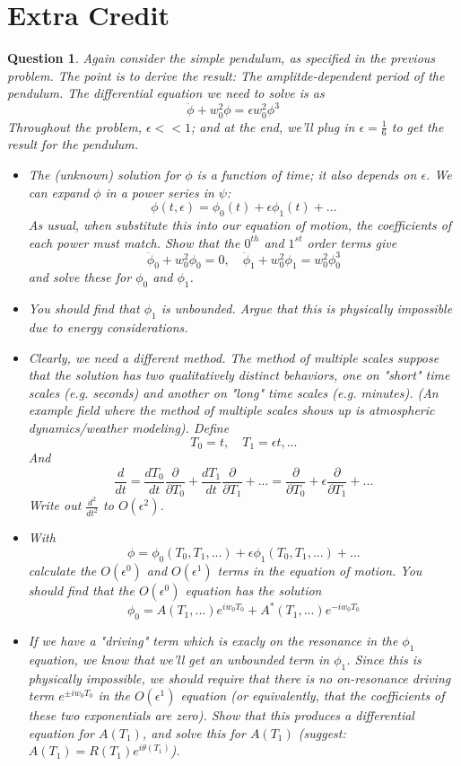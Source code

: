 \documentclass{article}
\newtheorem{question}{Question}
\begin{document}
\break

\section{Extra Credit}
\begin{question}\label{q7}
    Again consider the simple pendulum, as specified in the previous problem. The point is to derive the result: The amplitde-dependent period of the pendulum. The differential equation we need to solve is as 
    $$\ddot\phi+w_0^2\phi=\epsilon w_0^2\phi^3$$
    Throughout the problem, $\epsilon<<1$; and at the end, we'll plug in $\epsilon=\frac{1}{6}$ to get the result for the pendulum.
    \begin{itemize}
        \item[(a)] The (unknown) solution for $\phi$ is a function of time; it also depends on $\epsilon$. We can expand $\phi$ in a power series in $\psi$:
        $$\phi(t,\epsilon)=\phi_0(t)+\epsilon \phi_1(t)+...$$
        As usual, when substitute this into our equation of motion, the coefficients of each power must match. Show that the $0^{th}$ and $1^{st}$ order terms give 
        $$\ddot\phi_0+w_0^2\phi_0=0,\quad \ddot\phi_1+w_0^2\phi_1 = w_0^2\phi_0^3$$
        and solve these for $\phi_0$ and $\phi_1$.
        \item[(b)] You should find that $\phi_1$ is unbounded. Argue that this is physically impossible due to energy considerations.
        \item[(c)] Clearly, we need a different method. The \emph{method of multiple scales} suppose that the solution has two qualitatively distinct behaviors, one on "short" time scales (e.g. seconds) and another on "long" time scales (e.g. minutes). (An example field where the method of multiple scales shows up is atmospheric dynamics/weather modeling). Define 
        $$T_0=t,\quad T_1=\epsilon t,...$$
        And 
        $$\frac{d}{dt}=\frac{dT_0}{dt}\frac{\partial}{\partial T_0}+\frac{dT_1}{dt}\frac{\partial}{\partial T_1}+... = \frac{\partial}{\partial T_0}+\epsilon\frac{\partial}{\partial T_1}+...$$
        Write out $\frac{d^2}{dt^2}$ to $O(\epsilon^2)$.
        \item[(d)] With 
        $$\phi=\phi_0(T_0,T_1,...)+\epsilon\phi_1(T_0,T_1,...)+...$$
        calculate the $O(\epsilon^0)$ and $O(\epsilon^1)$ terms in the equation of motion. You should find that the $O(\epsilon^0)$ equation has the solution 
        $$\phi_0=A(T_1,...)e^{iw_0T_0}+A^*(T_1,...)e^{-iw_0T_0}$$
        \item[(e)] If we have a "driving" term which is exacly on the resonance in the $\phi_1$ equation, we know that we'll get an unbounded term in $\phi_1$. Since this is physically impossible, we should require that there is no on-resonance driving term $e^{\pm iw_0T_0}$ in the $O(\epsilon^1)$ equation (or equivalently, that the coefficients of these two exponentials are zero). Show that this produces a differential equation for $A(T_1)$, and solve this for $A(T_1)$ (suggest: $A(T_1) = R(T_1)e^{i\theta(T_1)}$).

\end{itemize}
\end{question}
\end{document}

